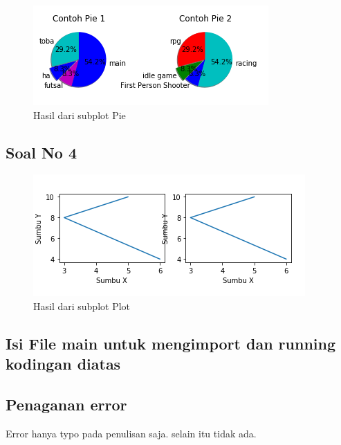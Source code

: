 

\begin{figure}[h]
\centering
\includegraphics[scale=1.2]{figures/6/Praktek/1174005/pie.png}
\caption{Hasil dari subplot Pie}
\label{fig:contoh}
\end{figure}

\subsection{Soal No 4}



\begin{figure}[h]
\centering
\includegraphics[scale=0.9]{figures/6/Praktek/1174005/plot.png}
\caption{Hasil dari subplot Plot}
\label{fig:contoh}
\end{figure}

\subsection{Isi File main untuk mengimport dan running kodingan diatas}



\subsection{Penaganan error}
Error hanya typo pada penulisan saja. selain itu tidak ada.


